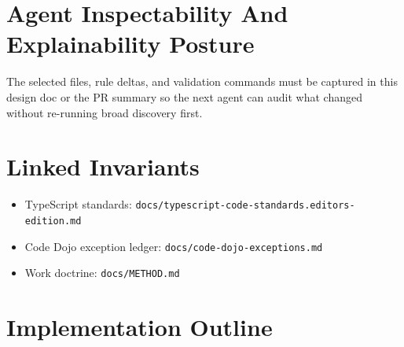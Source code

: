 \section{Agent Inspectability And Explainability Posture}\label{record-237-agent-inspectability-and-explainability-posture}

The selected files, rule deltas, and validation commands must be captured in this design doc or the PR summary so the next agent can audit what changed without re-running broad discovery first.

\section{Linked Invariants}\label{record-237-linked-invariants}

\begin{itemize}
\tightlist
\item
  TypeScript standards: \texttt{d\allowbreak{}o\allowbreak{}c\allowbreak{}s\allowbreak{}/\allowbreak{}t\allowbreak{}y\allowbreak{}p\allowbreak{}e\allowbreak{}s\allowbreak{}c\allowbreak{}r\allowbreak{}i\allowbreak{}p\allowbreak{}t\allowbreak{}-\allowbreak{}c\allowbreak{}o\allowbreak{}d\allowbreak{}e\allowbreak{}-\allowbreak{}s\allowbreak{}t\allowbreak{}a\allowbreak{}n\allowbreak{}d\allowbreak{}a\allowbreak{}r\allowbreak{}d\allowbreak{}s\allowbreak{}.\allowbreak{}e\allowbreak{}d\allowbreak{}i\allowbreak{}t\allowbreak{}o\allowbreak{}r\allowbreak{}s\allowbreak{}-\allowbreak{}e\allowbreak{}d\allowbreak{}i\allowbreak{}t\allowbreak{}i\allowbreak{}o\allowbreak{}n\allowbreak{}.\allowbreak{}m\allowbreak{}d}
\item
  Code Dojo exception ledger: \texttt{d\allowbreak{}o\allowbreak{}c\allowbreak{}s\allowbreak{}/\allowbreak{}c\allowbreak{}o\allowbreak{}d\allowbreak{}e\allowbreak{}-\allowbreak{}d\allowbreak{}o\allowbreak{}j\allowbreak{}o\allowbreak{}-\allowbreak{}e\allowbreak{}x\allowbreak{}c\allowbreak{}e\allowbreak{}p\allowbreak{}t\allowbreak{}i\allowbreak{}o\allowbreak{}n\allowbreak{}s\allowbreak{}.\allowbreak{}m\allowbreak{}d}
\item
  Work doctrine: \texttt{d\allowbreak{}o\allowbreak{}c\allowbreak{}s\allowbreak{}/\allowbreak{}M\allowbreak{}E\allowbreak{}T\allowbreak{}H\allowbreak{}O\allowbreak{}D\allowbreak{}.\allowbreak{}m\allowbreak{}d}
\end{itemize}

\section{Implementation Outline}\label{record-237-implementation-outline}

